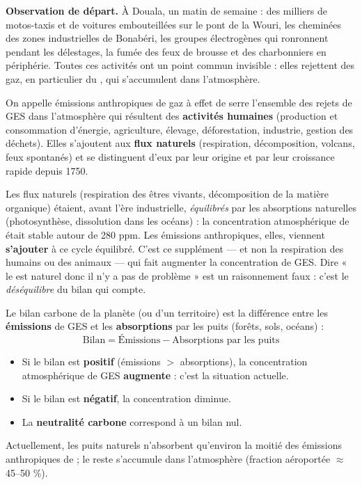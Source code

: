 \documentclass[11pt]{article}
\newcommand{\cle}[1]{{\popxbold\color{popdark}#1}}
\begin{document}
\textbf{Observation de départ.} À Douala, un matin de semaine : des milliers de motos-taxis et de voitures embouteillées sur le pont de la Wouri, les cheminées des zones industrielles de Bonabéri, les groupes électrogènes qui ronronnent pendant les délestages, la fumée des feux de brousse et des charbonniers en périphérie. Toutes ces activités ont un point commun invisible : elles rejettent des gaz, en particulier du , qui s'accumulent dans l'atmosphère.

\begin{definition}
On appelle \cle{émissions anthropiques} de gaz à effet de serre l'ensemble des rejets de GES dans l'atmosphère qui résultent des \textbf{activités humaines} (production et consommation d'énergie, agriculture, élevage, déforestation, industrie, gestion des déchets). Elles s'ajoutent aux \textbf{flux naturels} (respiration, décomposition, volcans, feux spontanés) et se distinguent d'eux par leur origine et par leur croissance rapide depuis 1750.
\end{definition}

\begin{attention}
Les flux naturels (respiration des êtres vivants, décomposition de la matière organique) étaient, avant l'ère industrielle, \emph{équilibrés} par les absorptions naturelles (photosynthèse, dissolution dans les océans) : la concentration atmosphérique de  était stable autour de 280 ppm. Les émissions anthropiques, elles, viennent \textbf{s'ajouter} à ce cycle équilibré. C'est ce supplément — et non la respiration des humains ou des animaux — qui fait augmenter la concentration de GES. Dire « le  est naturel donc il n'y a pas de problème » est un raisonnement faux : c'est le \emph{déséquilibre} du bilan qui compte.
\end{attention}

\begin{propriete}
Le \cle{bilan carbone} de la planète (ou d'un territoire) est la différence entre les \textbf{émissions} de GES et les \textbf{absorptions} par les puits (forêts, sols, océans) :
\[ \text{Bilan} = \text{Émissions} - \text{Absorptions par les puits} \]
\begin{itemize}
\item Si le bilan est \textbf{positif} (émissions $>$ absorptions), la concentration atmosphérique de GES \textbf{augmente} : c'est la situation actuelle.
\item Si le bilan est \textbf{négatif}, la concentration diminue.
\item La \textbf{neutralité carbone} correspond à un bilan nul.
\end{itemize}
Actuellement, les puits naturels n'absorbent qu'environ la moitié des émissions anthropiques de  ; le reste s'accumule dans l'atmosphère (fraction aéroportée $\approx$ 45--50 \%). 
\end{propriete}
\end{document}
